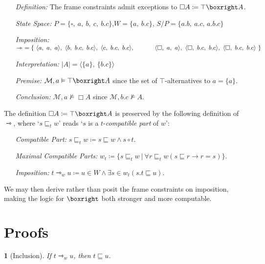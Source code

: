 \documentclass[a4paper, 11pt]{article} %
\theoremstyle{Pthm}
\newtheorem{Pthm}{}[section]%
\newcommand{\tuple}[1]{\langle#1\rangle} %
\newcommand{\set}[1]{\lbrace#1\rbrace} %
\renewcommand{\vert}[1]{\lvert#1\rvert}
\begin{document}
\begin{enumerate}[leftmargin=1in]
  \item[\it Definition:] The frame constraints admit exceptions to $\Box A \coloneq \top \boxright A$.
  \item[\it State Space:] $P = \set{\square,\ a,\ b,\ c,\ b.c}$,\quad $W = \set{a,\ b.c}$, \quad $S/P = \set{a.b,\ a.c,\, a.b.c}$
  \item[\it Imposition:] $\rightarrowtriangle\ = \set{\
    \tuple{a,\ a,\ a},\ \tuple{b,\ b.c,\ b.c},\ \tuple{c,\ b.c,\ b.c},\\ 
    \strut\hspace{.46in} \tuple{\square,\ a,\ a},\ \tuple{\square,\ b.c,\ b.c},\ \tuple{\square,\ b.c,\ b.c}\ 
  }$
  \item[\it Interpretation:] $\vert{A} = \tuple{\set{a},\ \set{b.c}}$
  \item[\it Premise:] $\mathcal{M}, a \vDash \top \boxright A$ since the set of $\top$-alternatives to $a = \set{a}$.
  \item[\it Conclusion:] $\mathcal{M}, a \nvDash \Box A$ since $\mathcal{M}, b.c \nvDash A$.
\end{enumerate}
The definition $\Box A \coloneq \top \boxright A$ is preserved by the following definition of $\rightarrowtriangle$, where `$s \sqsubseteq_t w$' reads `$s$ is a $t$-\textit{compatible part} of $w$':
\begin{enumerate}[leftmargin=2in, itemsep=.05in]
  \item[\it Compatible Part:] $s \sqsubseteq_t w \coloneq s \sqsubseteq w \wedge s \circ t$. 
  \item[\it Maximal Compatible Parts:] $w_t \coloneq \set{s \sqsubseteq_t w \ |\ \forall r \sqsubseteq_t w (s \sqsubseteq r \rightarrow r = s)}$.
  \item[\it Imposition:] $t \rightarrowtriangle_w u \coloneq u \in W \wedge \exists s \in w_t(s.t \sqsubseteq u)$.
\end{enumerate}
We may then derive rather than posit the frame constraints on imposition, making the logic for $\boxright$ both stronger and more computable.

      



\section*{Proofs}%

\begin{Pthm}[\sc Inclusion] \label{app:Inclusion}
  If $t \rightarrowtriangle_w u$, then $t \sqsubseteq u$.
\end{Pthm}
\end{document}
